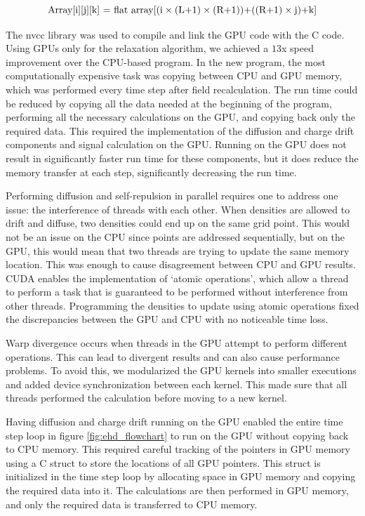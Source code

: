 \begin{equation}{\label{flat_array}}
 \text{Array[i][j][k] = flat array[(i} \times \text{(L+1)}\times \text{(R+1))+((R+1)}\times \text{j)+k]}
\end{equation}

The nvcc library was used to compile and link the GPU {\cpp} code with the {\ehd} C code. Using GPUs only for the relaxation algorithm, we achieved a $13$x speed improvement over the CPU-based program. In the new program, the most computationally expensive task was copying between CPU and GPU memory, which was performed every time step after field recalculation. The run time could be reduced by copying all the data needed at the beginning of the program, performing all the necessary calculations on the GPU, and copying back only the required data. This required the implementation of the diffusion and charge drift components and signal calculation on the GPU. Running on the GPU does not result in significantly faster run time for these components, but it does reduce the memory transfer at each step, significantly decreasing the run time.

Performing diffusion and self-repulsion in parallel requires one to address one issue: the interference of threads with each other. When densities are allowed to drift and diffuse, two densities could end up on the same grid point. This would not be an issue on the CPU since points are addressed sequentially, but on the GPU, this would mean that two threads are trying to update the same memory location. This was enough to cause disagreement between CPU and GPU results. CUDA enables the implementation of `atomic operations', which allow a thread to perform a task that is guaranteed to be performed without interference from other threads. Programming the densities to update using atomic operations fixed the discrepancies between the GPU and CPU with no noticeable time loss.

Warp divergence occurs when threads in the GPU attempt to perform different operations. This can lead to divergent results and can also cause performance problems. To avoid this, we modularized the GPU kernels into smaller executions and added device synchronization between each kernel. This made sure that all threads performed the calculation before moving to a new kernel.

Having diffusion and charge drift running on the GPU enabled the entire time step loop in figure \ref{fig:ehd_flowchart} to run on the GPU without copying back to CPU memory. This required careful tracking of the pointers in GPU memory using a C struct to store the locations of all GPU pointers. This struct is initialized in the time step loop by allocating space in GPU memory and copying the required data into it. The calculations are then performed in GPU memory, and only the required data is transferred to CPU memory.

